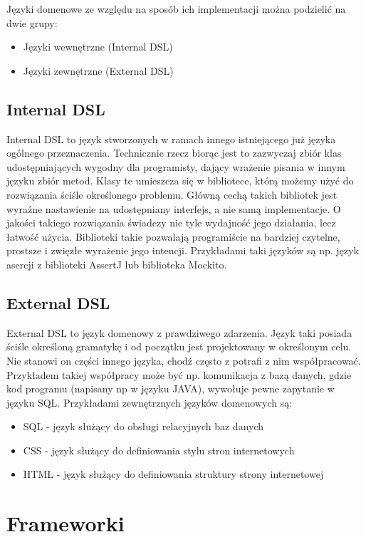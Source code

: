 \documentclass{xmgr}
\begin{document}
Języki domenowe ze względu na sposób ich implementacji można podzielić na dwie grupy:
\begin{itemize}
\item Języki wewnętrzne (Internal DSL)
\item Języki zewnętrzne (External DSL)
\end{itemize}

\subsection{Internal DSL}

Internal DSL to język stworzonych w ramach innego istniejącego już języka ogólnego przeznaczenia. Technicznie rzecz biorąc jest to zazwyczaj zbiór klas udostępniających wygodny dla programisty, dający wrażenie pisania w innym języku zbiór metod. Klasy te umieszcza się w bibliotece, którą możemy użyć do rozwiązania ściśle określonego problemu. Główną cechą takich bibliotek jest wyraźne nastawienie na udostępniany interfejs, a nie samą implementacje. O jakości takiego rozwiązania świadczy nie tyle wydajność jego działania, lecz łatwość użycia. Biblioteki takie pozwalają programiście na bardziej czytelne, prostsze i zwięzłe wyrażenie jego intencji. Przykładami taki języków są np. język asercji z biblioteki AssertJ lub  biblioteka Mockito. 

\subsection{External DSL}

External DSL to język domenowy z prawdziwego zdarzenia. Język taki posiada ściśle określoną gramatykę i od początku jest projektowany w określonym celu. Nie stanowi on części innego języka, chodź często z potrafi z nim współpracować. Przykładem takiej współpracy może być np. komunikacja z bazą danych, gdzie kod programu (napisany np w języku JAVA), wywołuje pewne zapytanie w języku SQL. Przykładami zewnętrznych języków domenowych są:
\begin{itemize}
	\item SQL - język służący do obsługi relacyjnych baz danych
	\item CSS - język służący do definiowania stylu stron internetowych 
	\item HTML - język służący do definiowania struktury strony internetowej
\end{itemize}

\section{Frameworki}
\end{document}
